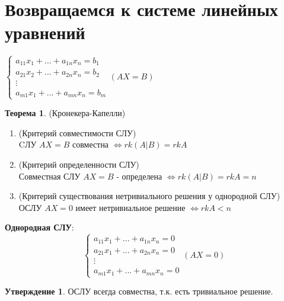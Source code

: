 \documentclass[a4paper, 12pt]{article}
\theoremstyle{definition}
\newtheorem*{theorem}{Теорема}
\newtheorem*{subtheorem}{Утверждение}
\begin{document}
  \newpage
  
  \section{Возвращаемся к системе линейных уравнений}
  $\begin{cases}
    a_{11}x_1 + ... + a_{1n}x_n = b_1 \\ 
    a_{21}x_2 + ... + a_{2n}x_n = b_2 \\
    \vdots \\
    a_{m1}x_1 + ... + a_{mn}x_n = b_m
  \end{cases} (AX = B)$
  \begin{theorem} (Кронекера-Капелли)
    \begin{enumerate}
      \item (Критерий совместимости СЛУ) \\ CЛУ $AX = B$ совместна $\Longleftrightarrow rk(A|B) = rkA$ 
      \item (Критерий определенности СЛУ) \\ Совместная СЛУ $AX =B$ - определена $\Longleftrightarrow rk(A|B) = rkA = n$ 
      \item (Критерий существования нетривиального решения у однородной СЛУ) \\ ОСЛУ $AX = 0$ имеет нетривиальное решение $\Longleftrightarrow rkA<n$ 
    \end{enumerate}
  \end{theorem}
  \textbf{Однородная СЛУ}: 
  $$\begin{cases}
    a_{11}x_1 + ... + a_{1n}x_n = 0 \\ 
    a_{21}x_1 + ... + a_{2n}x_n = 0 \\
    \vdots \\
    a_{m1}x_1 + ... + a_{mn}x_n = 0
  \end{cases} (AX = 0)$$
  \begin{subtheorem}
    ОСЛУ всегда совместна, т.к. есть тривиальное решение.
  \end{subtheorem} 
\end{document}
